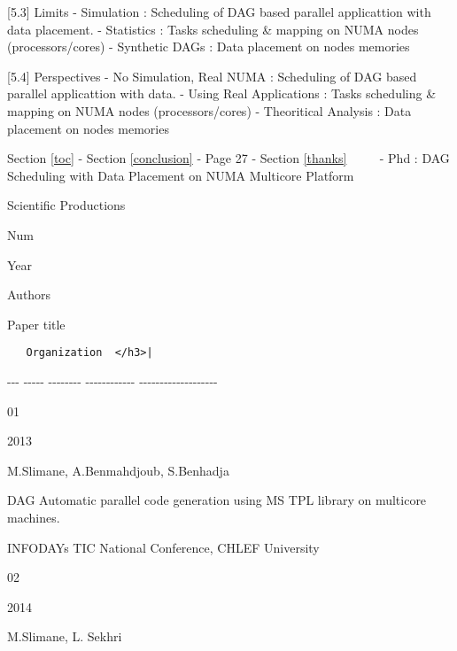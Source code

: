 \documentclass[11pt]{article}
\begin{document}
{[}5.3{]} Limits - Simulation : Scheduling of DAG based parallel
applicattion with data placement. - Statistics : Tasks scheduling \&
mapping on NUMA nodes (processors/cores) - Synthetic DAGs : Data
placement on nodes memories

{[}5.4{]} Perspectives - No Simulation, Real NUMA : Scheduling of DAG
based parallel applicattion with data. - Using Real Applications : Tasks
scheduling \& mapping on NUMA nodes (processors/cores) - Theoritical
Analysis : Data placement on nodes memories

     {Section \ref{toc} - Section \ref{conclusion} - Page 27 -
Section \ref{thanks} ~~~~ - Phd : DAG Scheduling with Data Placement on
NUMA Multicore Platform}

Scientific Productions

\textbar{}

Num

\textbar{}

Year

\textbar{}

Authors

\textbar{}

Paper title

\textbar{}

\begin{verbatim}
   Organization  </h3>|
\end{verbatim}

\textbar{} -\/-\/-\textbar{} -\/-\/-\/-\/-\textbar{}
-\/-\/-\/-\/-\/-\/-\/- \textbar{} -\/-\/-\/-\/-\/-\/-\/-\/-\/-\/-\/-
\textbar{}-\/-\/-\/-\/-\/-\/-\/-\/-\/-\/-\/-\/-\/-\/-\/-\/-\/-\/-
\textbar{} \textbar{}

01

\textbar{}

2013

\textbar{}

M.Slimane, A.Benmahdjoub, S.Benhadja

\textbar{}

DAG Automatic parallel code generation using MS TPL library on multicore
machines.

\textbar{}

INFODAYs TIC National Conference, CHLEF University

\textbar{} \textbar{}

02

\textbar{}

2014

\textbar{}

M.Slimane, L. Sekhri
\end{document}

